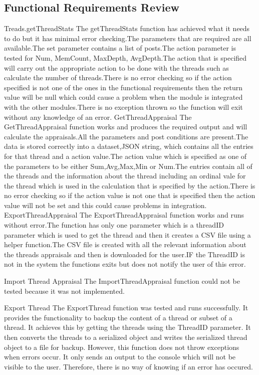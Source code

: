 \subsection{Functional Requirements Review}
Treads.getThreadStats
The getThreadStats function has achieved what it needs to do but it has minimal error checking.The parameters that are required are all available.The set parameter contains a list of posts.The action parameter is tested for Num, MemCount, MaxDepth, AvgDepth.The action that is specified will carry out the appropriate action to be done with the threads such as calculate the number of threads.There is no error checking so if the action specified is not one of the ones in the functional requirements then the return value will be null which could cause a problem when the module is integrated with the other modules.There is no exception thrown so the function will exit without any knowledge of an error.
GetThreadAppraisal
The GetThreadAppraisal function works and produces the required output and will calculate the appraisals.All the parameters and post conditions are present.The data is stored correctly into a dataset,JSON string, which contains all the entries for that thread and a action value.The action value which is specified as one of the parameters to be either Sum,Avg,Max,Min or Num.The entries contain all of the threads and the information about the thread including an ordinal vale for the thread which is used in the calculation that is specified by the action.There is no error checking so if the action value is not one that is specified then the action value will not be set and this could cause problems in integration.
ExportThreadAppraisal
The ExportThreadAppraisal function works and runs without error.The function has only one parameter which is a threadID parameter which is used to get the thread and then it creates a CSV file using a helper function.The CSV file is created with all the relevant information about the threads appraisals and then is downloaded for the user.IF the ThreadID is not in the system the functions exits but does not notify the user of this error.

Import Thread Appraisal
The ImportThreadAppraisal function could not be tested because it was not implemented. 

Export Thread
The ExportThread function was tested and runs successfully. It provides the functionality to backup the content of a thread or subset of a thread. It achieves this by getting the threads using the ThreadID parameter. It then converts the threads to a serialized object and writes the serialized thread object to a file for backup. However, this function does not throw exceptions when errors occur. It only sends an output to the console which will not be visible to the user. Therefore, there is no way of knowing if an error has occured.

